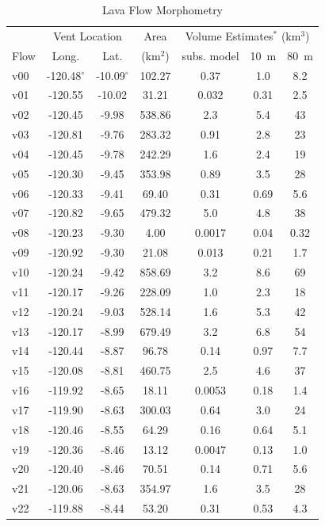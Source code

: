\documentclass[12pt,letter]{article}
\begin{document}
	\begin{table}[h!]
	\centering
	\caption{Lava Flow Morphometry}
	\begin{tabular}{l c c c c c c}
		\toprule
			 & \multicolumn{2}{c}{Vent Location}  & Area & \multicolumn{3}{c}{Volume Estimates$^*$ (km$^3$)}\\
			Flow & Long. & Lat. & (km$^2$) & subs. model & 10~m & 80~m\\
		\midrule
			v00 & -120.48$^{\circ}$ & -10.09$^{\circ}$ & 102.27 & 0.37 & 1.0 & 8.2\\
			v01 & -120.55 & -10.02 & 31.21 & 0.032 & 0.31 & 2.5\\
			v02 & -120.45 & -9.98 & 538.86 & 2.3 & 5.4 & 43\\
			v03 & -120.81 & -9.76 & 283.32 & 0.91 & 2.8 & 23\\
			v04 & -120.45 & -9.78 & 242.29 & 1.6 & 2.4 & 19\\
			v05 & -120.30 & -9.45 & 353.98 & 0.89 & 3.5 & 28\\
			v06 & -120.33 & -9.41 & 69.40 & 0.31 & 0.69 & 5.6\\
			v07 & -120.82 & -9.65 & 479.32 & 5.0 & 4.8 & 38\\
			v08 & -120.23 & -9.30 & 4.00 & 0.0017 & 0.04 & 0.32\\
			v09 & -120.92 & -9.30 & 21.08 & 0.013 & 0.21 & 1.7\\
			v10 & -120.24 & -9.42 & 858.69 & 3.2 & 8.6 & 69\\
			v11 & -120.17 & -9.26 & 228.09 & 1.0 & 2.3 & 18\\
			v12 & -120.24 & -9.03 & 528.14 & 1.6 & 5.3 & 42\\
			v13 & -120.17 & -8.99 & 679.49 & 3.2 & 6.8 & 54\\
			v14 & -120.44 & -8.87 & 96.78 & 0.14 & 0.97 & 7.7\\
			v15 & -120.08 & -8.81 & 460.75 & 2.5 & 4.6 & 37\\
			v16 & -119.92 & -8.65 & 18.11 & 0.0053 & 0.18 & 1.4\\
			v17 & -119.90 & -8.63 & 300.03 & 0.64 & 3.0 & 24\\
			v18 & -120.46 & -8.55 & 64.29 & 0.16 & 0.64 & 5.1\\
			v19 & -120.36 & -8.46 & 13.12 & 0.0047 & 0.13 & 1.0\\
			v20 & -120.40 & -8.46 & 70.51 & 0.14 & 0.71 & 5.6\\
			v21 & -120.06 & -8.63 & 354.97 & 1.6 & 3.5 & 28\\
			v22 & -119.88 & -8.44 & 53.20 & 0.31 & 0.53 & 4.3\\

\end{tabular}
\end{table}
\end{document}
